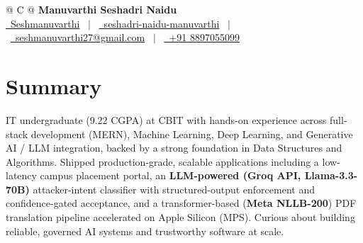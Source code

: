 \documentclass[a4paper,11pt]{article}
\begin{document}
\pagestyle{empty}
\begin{tabularx}{\linewidth}{@{} C @{}}
{\Huge \textbf{Manuvarthi Seshadri Naidu}} \\[7pt]
\href{https://github.com/Seshmanuvarthi}{\raisebox{-0.05\height}\faGithub\ Seshmanuvarthi} \ $|$ \
\href{https://www.linkedin.com/in/seshadri-naidu-manuvarthi-366466295/}{\raisebox{-0.05\height}\faLinkedin\ seshadri-naidu-manuvarthi} \ $|$ \
\href{mailto:seshmanuvarthi27@gmail.com}{\raisebox{-0.05\height}\faEnvelope\ seshmanuvarthi27@gmail.com} \ $|$ \
\href{tel:+918897055099}{\raisebox{-0.05\height}\faMobile\ +91 8897055099} \\
\end{tabularx}

\section{Summary}
\vspace{2pt}
IT undergraduate (9.22 CGPA) at CBIT with hands-on experience across full-stack development (MERN), Machine Learning, Deep Learning, and Generative AI / LLM integration, backed by a strong foundation in Data Structures and Algorithms. Shipped production-grade, scalable applications including a low-latency campus placement portal, an \textbf{LLM-powered (Groq API, Llama-3.3-70B)} attacker-intent classifier with structured-output enforcement and confidence-gated acceptance, and a transformer-based (\textbf{Meta NLLB-200}) PDF translation pipeline accelerated on Apple Silicon (MPS). Curious about building reliable, governed AI systems and trustworthy software at scale.

\end{document}
